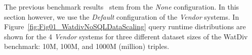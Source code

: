 %
%
The previous benchmark results~\cite{de2016big} stem from the \emph{None} configuration. In this section however, we use the \emph{Default} configuration of the \emph{Vendor} systems.
In Figure~\ref{fig:Fig01_WatdivNoSQLDataScaling} query runtime distributions are shown for the 4 \emph{Vendor} systems for three different dataset sizes of the WatDiv benchmark: 10M, 100M, and 1000M (million) triples.
%
%
%  

